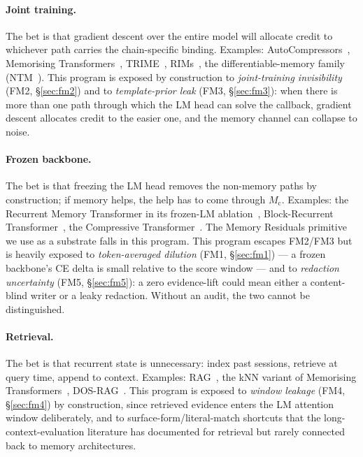 \documentclass{article}
\newcommand{\Mc}{M_{\mathrm{c}}}
\begin{document}
\paragraph{Joint training.}  The bet is that gradient descent over
the entire model will allocate credit to whichever path carries the
chain-specific binding.  Examples: AutoCompressors~\cite{autocompressors2023},
Memorising Transformers~\cite{memorizing2022}, TRIME~\cite{trime2022},
RIMs~\cite{rmt2022}, the differentiable-memory family
(NTM~\cite{ntm2014}).  This program is exposed by construction to
\emph{joint-training invisibility} (FM2, \S\ref{sec:fm2}) and to
\emph{template-prior leak} (FM3, \S\ref{sec:fm3}): when there is more
than one path through which the LM head can solve the callback,
gradient descent allocates credit to the easier one, and the memory
channel can collapse to noise.

\paragraph{Frozen backbone.}  The bet is that freezing the LM head
removes the non-memory paths by construction; if memory helps,
the help has to come through $\Mc$.  Examples: the Recurrent Memory
Transformer in its frozen-LM ablation~\cite{rmt2022,armt2024},
Block-Recurrent Transformer~\cite{blockrecurrent2022}, the Compressive
Transformer~\cite{compressive2019}.  The Memory Residuals primitive
we use as a substrate falls in this program.  This program escapes
FM2/FM3 but is heavily exposed to \emph{token-averaged dilution} (FM1,
\S\ref{sec:fm1}) --- a frozen backbone's CE delta is small relative
to the score window --- and to \emph{redaction uncertainty} (FM5,
\S\ref{sec:fm5}): a zero evidence-lift could mean either a
content-blind writer or a leaky redaction.  Without an audit, the two
cannot be distinguished.

\paragraph{Retrieval.}  The bet is that recurrent state is
unnecessary: index past sessions, retrieve at query time, append to
context.  Examples: RAG~\cite{ragoriginal2020}, the kNN variant of
Memorising Transformers~\cite{memorizing2022}, DOS-RAG~\cite{ragbaseline2025}.
This program is exposed to \emph{window leakage} (FM4,
\S\ref{sec:fm4}) by construction, since retrieved evidence enters the
LM attention window deliberately, and to surface-form/literal-match
shortcuts that the long-context-evaluation literature
\cite{nolima2025,ruler2024,lostmiddle2024} has documented for
retrieval but rarely connected back to memory architectures.
\end{document}
